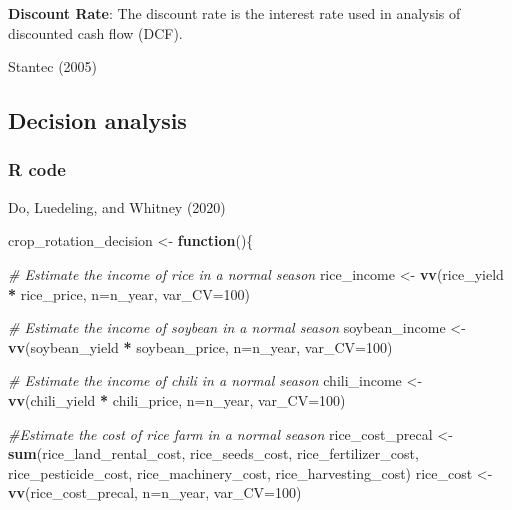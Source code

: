 \documentclass[
]{article}
\newenvironment{Shaded}{\begin{snugshade}}{\end{snugshade}}
\newcommand{\AttributeTok}[1]{\textcolor[rgb]{0.13,0.29,0.53}{#1}}
\newcommand{\CommentTok}[1]{\textcolor[rgb]{0.56,0.35,0.01}{\textit{#1}}}
\newcommand{\ControlFlowTok}[1]{\textcolor[rgb]{0.13,0.29,0.53}{\textbf{#1}}}
\newcommand{\DecValTok}[1]{\textcolor[rgb]{0.00,0.00,0.81}{#1}}
\newcommand{\FunctionTok}[1]{\textcolor[rgb]{0.13,0.29,0.53}{\textbf{#1}}}
\newcommand{\NormalTok}[1]{#1}
\newcommand{\OtherTok}[1]{\textcolor[rgb]{0.56,0.35,0.01}{#1}}
\newcommand{\SpecialCharTok}[1]{\textcolor[rgb]{0.81,0.36,0.00}{\textbf{#1}}}
\begin{document}
\textbf{Discount Rate}: The discount rate is the interest rate used in
analysis of discounted cash flow (DCF).

Stantec (2005)

\hypertarget{decision-analysis}{%
\subsection{Decision analysis}\label{decision-analysis}}

\hypertarget{r-code}{%
\subsubsection{R code}\label{r-code}}

Do, Luedeling, and Whitney (2020)

\begin{Shaded}
\begin{Highlighting}[]
\NormalTok{crop\_rotation\_decision }\OtherTok{\textless{}{-}} \ControlFlowTok{function}\NormalTok{()\{}
  
  \CommentTok{\# Estimate the income of rice in a normal season}
\NormalTok{  rice\_income }\OtherTok{\textless{}{-}} \FunctionTok{vv}\NormalTok{(rice\_yield }\SpecialCharTok{*}\NormalTok{ rice\_price, }\AttributeTok{n=}\NormalTok{n\_year, }\AttributeTok{var\_CV=}\DecValTok{100}\NormalTok{)}
  
  \CommentTok{\# Estimate the income of soybean in a normal season}
\NormalTok{  soybean\_income }\OtherTok{\textless{}{-}} \FunctionTok{vv}\NormalTok{(soybean\_yield }\SpecialCharTok{*}\NormalTok{ soybean\_price, }\AttributeTok{n=}\NormalTok{n\_year, }\AttributeTok{var\_CV=}\DecValTok{100}\NormalTok{)}
  
  \CommentTok{\# Estimate the income of chili in a normal season}
\NormalTok{  chili\_income }\OtherTok{\textless{}{-}} \FunctionTok{vv}\NormalTok{(chili\_yield }\SpecialCharTok{*}\NormalTok{ chili\_price, }\AttributeTok{n=}\NormalTok{n\_year, }\AttributeTok{var\_CV=}\DecValTok{100}\NormalTok{)}
  
  \CommentTok{\#Estimate the cost of rice farm in a normal season}
\NormalTok{  rice\_cost\_precal }\OtherTok{\textless{}{-}} \FunctionTok{sum}\NormalTok{(rice\_land\_rental\_cost, rice\_seeds\_cost, rice\_fertilizer\_cost,}
\NormalTok{                          rice\_pesticide\_cost, rice\_machinery\_cost, rice\_harvesting\_cost)}
\NormalTok{  rice\_cost }\OtherTok{\textless{}{-}} \FunctionTok{vv}\NormalTok{(rice\_cost\_precal, }\AttributeTok{n=}\NormalTok{n\_year, }\AttributeTok{var\_CV=}\DecValTok{100}\NormalTok{)}
  

\end{Highlighting}
\end{Shaded}
\end{document}
